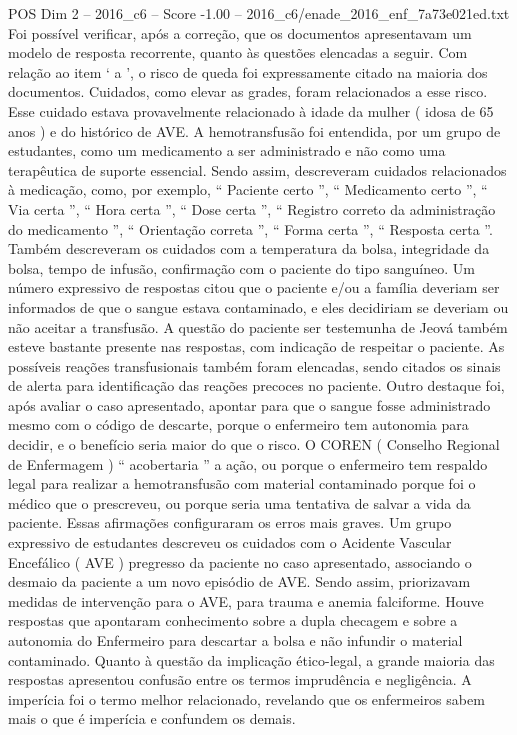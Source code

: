 \begin{textsample}{POS Dim 2 – 2016\_c6 – Score -1.00 – 2016\_c6/enade\_2016\_enf\_7a73e021ed.txt}
Foi possível verificar, após a correção, que os documentos apresentavam um modelo de resposta recorrente, quanto às questões elencadas a seguir.
Com relação ao item ‘ a ’, o risco de queda foi expressamente citado na maioria dos documentos.
Cuidados, como elevar as grades, foram relacionados a esse risco.
Esse cuidado estava provavelmente relacionado à idade da mulher ( idosa de 65 anos ) e do histórico de AVE.
A hemotransfusão foi entendida, por um grupo de estudantes, como um medicamento a ser administrado e não como uma terapêutica de suporte essencial.
Sendo assim, descreveram cuidados relacionados à medicação, como, por exemplo, “ Paciente certo ”, “ Medicamento certo ”, “ Via certa ”, “ Hora certa ”, “ Dose certa ”, “ Registro correto da administração do medicamento ”, “ Orientação correta ”, “ Forma certa ”, “ Resposta certa ”.
Também descreveram os cuidados com a temperatura da bolsa, integridade da bolsa, tempo de infusão, confirmação com o paciente do tipo sanguíneo.
Um número expressivo de respostas citou que o paciente e/ou a família deveriam ser informados de que o sangue estava contaminado, e eles decidiriam se deveriam ou não aceitar a transfusão.
A questão do paciente ser testemunha de Jeová também esteve bastante presente nas respostas, com indicação de respeitar o paciente.
As possíveis reações transfusionais também foram elencadas, sendo citados os sinais de alerta para identificação das reações precoces no paciente.
Outro destaque foi, após avaliar o caso apresentado, apontar para que o sangue fosse administrado mesmo com o código de descarte, porque o enfermeiro tem autonomia para decidir, e o benefício seria maior do que o risco.
O COREN ( Conselho Regional de Enfermagem ) “ acobertaria ” a ação, ou porque o enfermeiro tem respaldo legal para realizar a hemotransfusão com material contaminado porque foi o médico que o prescreveu, ou porque seria uma tentativa de salvar a vida da paciente.
Essas afirmações configuraram os erros mais graves.
Um grupo expressivo de estudantes descreveu os cuidados com o Acidente Vascular Encefálico ( AVE ) pregresso da paciente no caso apresentado, associando o desmaio da paciente a um novo episódio de AVE.
Sendo assim, priorizavam medidas de intervenção para o AVE, para trauma e anemia falciforme.
Houve respostas que apontaram conhecimento sobre a dupla checagem e sobre a autonomia do Enfermeiro para descartar a bolsa e não infundir o material contaminado.
Quanto à questão da implicação ético-legal, a grande maioria das respostas apresentou confusão entre os termos imprudência e negligência.
A imperícia foi o termo melhor relacionado, revelando que os enfermeiros sabem mais o que é imperícia e confundem os demais.

\end{textsample}
